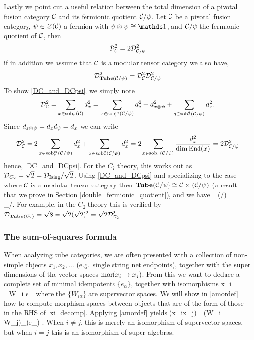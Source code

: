 Lastly we point out a useful relation between the total dimension of a pivotal fusion category $\mathcal{C}$ and its fermionic quotient $\mathcal{C}/\psi$.
Let $\mathcal{C}$ be a pivotal fusion category, $\psi \in \mathcal{Z}(\mathcal{C})$ a fermion with $\psi \tp \psi \cong \unit$,  and $\mathcal{C}/\psi$ the fermionic quotient of $\mathcal{C}$,
then
\begin{align}
\label{DC_and_DCpsi}
\mathcal{D}_{\mathcal{C}}^2 = 2 \mathcal{D}^2_{\mathcal{C}/\psi}
\end{align}
if in addition we assume that $\mathcal{C}$ is a modular tensor category we also have,
\begin{align}
\label{TubeDim_and_dimCCpsi}
\mathcal{D}_{\textbf{Tube}(\mathcal{C}/\psi)}^2 = \mathcal{D}_{\mathcal{C}}^2 \mathcal{D}_{\mathcal{C}/\psi}^2
\end{align}
To show \eqref{DC_and_DCpsi}, we simply note 
\begin{align}
\mathcal{D}^2_{\mathcal{C}} = \sum_{x\in \text{sob}_r(\mathcal{C})} d_x^2 = \sum_{x \in \text{sob}_r^m(\mathcal{C}/\psi)} d_x^2 + d_{x \otimes \psi}^2  + \sum_{q \in \text{sob}_r^q(\mathcal{C}/\psi)} d_x^2.
\end{align}
Since $d_{x \otimes \psi}  = d_x d_\psi = d_x$ we can write
\begin{align} 
\label{dimCtoDimCpsi}
\mathcal{D}_{\mathcal{C}}^2 =2 \sum_{ x \in \text{sob}_r^m(\mathcal{C}/\psi)} d_x^2 + \sum_{x \in \text{sob}_r^q(\mathcal{C}/\psi)} d_x^2 = 2 \sum_{x \in \text{sob}_r(\mathcal{C}/\psi)} \frac{d_x^2}{\dim \text{End}(x)} = 2 \mathcal{D}_{\mathcal{C}/\psi}^2
\end{align} 
hence, \eqref{DC_and_DCpsi}. 
For the $C_2$ theory, this works out as 
$\mathcal{D}_{C_2} = \sqrt{2} = \mathcal{D}_{\rm Ising} / \sqrt{2}$.
Using \eqref{DC_and_DCpsi} and specializing to the case where $\mathcal{C}$ is a modular tensor category then $\textbf{Tube}(\mathcal{C}/\psi) \cong \mathcal{C} \times (\mathcal{C}/\psi) $ 
(a result that we prove in Section \ref{double_fermionic_quotient}), and we have 
\be \mcd_{\tube(\mcc/\psi)} = \mcd_{\mcc} \mcd_{\mcc/\psi}.\ee
For example, in the $C_2$ theory this is verified by $\mathcal{D}_{\textbf{Tube}(C_2)} = \sqrt{8} = \sqrt{2} (\sqrt{2})^2 = \sqrt{2} \mathcal{D}^2_{C_2}.$



\subsubsection{The sum-of-squares formula}

When analyzing tube categories, we are often presented with a collection of non-simple objects $x_1, x_2, \ldots$
(e.g.~single string net endpoints), together with the super dimensions of the vector spaces $\text{mor}(x_i\to x_j)$.
From this we want to deduce a complete set of minimal idempotents $\{e_\alpha\}$, together with isomorphisms
\be \label{xi_decomp}
	x_i \cong \bigoplus_\alpha W_{i\alpha} \cdot e_\alpha 
\ee
where the $\{W_{i\alpha}\}$ are supervector spaces. 
We will show in \eqref{amordef} how to compute morphism spaces between objects that are 
of the form of those in the RHS of \eqref{xi_decomp}. 
Applying \eqref{amordef} yields
\be  \label{coldotprod}
	\mor(x_i\to x_j) \cong \bigoplus_\alpha \Hom(W_{i\alpha} \to W_{j\alpha})\otimes_\cc \End(e_\alpha) .
\ee
When $i\ne j$, this is merely an isomorphism of supervector spaces, but when $i = j$ this is an isomorphism of super algebras.

